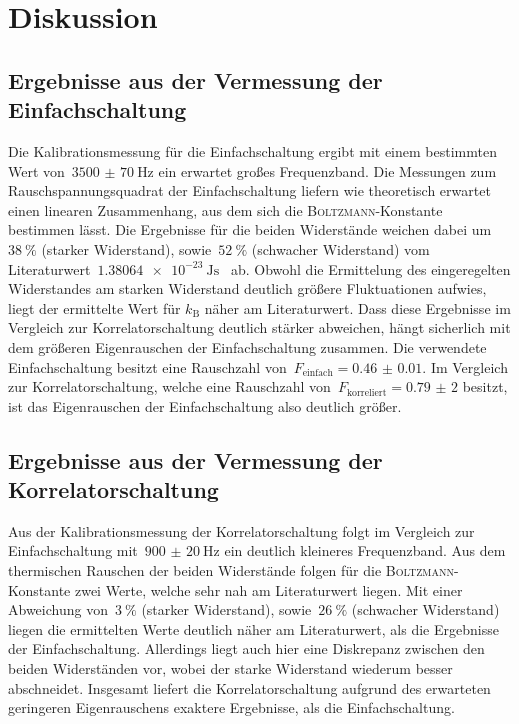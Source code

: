 \section{Diskussion}
\label{sec:diskussion}
%
\subsection{Ergebnisse aus der Vermessung der Einfachschaltung}
%
Die Kalibrationsmessung für die Einfachschaltung ergibt mit einem bestimmten
Wert von~$\SI{3500(70)}{\hertz}$ ein erwartet großes Frequenzband. Die Messungen
zum Rauschspannungsquadrat der Einfachschaltung liefern wie theoretisch erwartet
einen linearen Zusammenhang, aus dem sich die \textsc{Boltzmann}-Konstante
bestimmen lässt. Die Ergebnisse für die beiden Widerstände weichen dabei
um~$\SI{38}{\percent}$ (starker Widerstand), sowie~$\SI{52}{\percent}$
(schwacher Widerstand) vom
Literaturwert~$\SI{1.38064e-23}{\joule\second}$~\cite{CODATA} ab. Obwohl die
Ermittelung des eingeregelten Widerstandes am starken Widerstand deutlich
größere Fluktuationen aufwies, liegt der ermittelte Wert für $k_{\text{B}}$
näher am Literaturwert. Dass diese Ergebnisse im Vergleich zur
Korrelatorschaltung deutlich stärker abweichen, hängt sicherlich mit dem
größeren Eigenrauschen der Einfachschaltung zusammen. Die verwendete
Einfachschaltung besitzt eine Rauschzahl von~$F_{\text{einfach}}=\num{0.46(1)}$.
Im Vergleich zur Korrelatorschaltung, welche eine Rauschzahl
von~$F_{\text{korreliert}}=\num{0,79(2)}$ besitzt, ist das Eigenrauschen der
Einfachschaltung also deutlich größer.
%
\subsection{Ergebnisse aus der Vermessung der Korrelatorschaltung}
%
Aus der Kalibrationsmessung der Korrelatorschaltung folgt im Vergleich zur
Einfachschaltung mit~$\SI{900(20)}{\hertz}$ ein deutlich kleineres Frequenzband.
Aus dem thermischen Rauschen der beiden Widerstände folgen für die
\textsc{Boltzmann}-Konstante zwei Werte, welche sehr nah am Literaturwert
liegen. Mit einer Abweichung von~$\SI{3}{\percent}$ (starker Widerstand),
sowie~$\SI{26}{\percent}$ (schwacher Widerstand) liegen die ermittelten Werte
deutlich näher am Literaturwert, als die Ergebnisse der Einfachschaltung.
Allerdings liegt auch hier eine Diskrepanz zwischen den beiden Widerständen vor,
wobei der starke Widerstand wiederum besser abschneidet. Insgesamt liefert die
Korrelatorschaltung aufgrund des erwarteten geringeren Eigenrauschens exaktere
Ergebnisse, als die Einfachschaltung.
%
